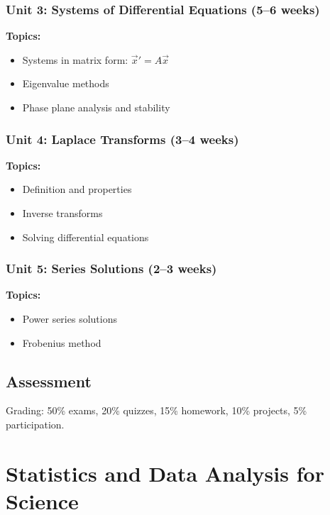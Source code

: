 \documentclass[12pt,oneside]{book}
\begin{document}
\subsection{Unit 3: Systems of Differential Equations (5--6 weeks)}

\textbf{Topics:}
\begin{itemize}
    \item Systems in matrix form: $\vec{x}' = A\vec{x}$
    \item Eigenvalue methods
    \item Phase plane analysis and stability
\end{itemize}

\subsection{Unit 4: Laplace Transforms (3--4 weeks)}

\textbf{Topics:}
\begin{itemize}
    \item Definition and properties
    \item Inverse transforms
    \item Solving differential equations
\end{itemize}

\subsection{Unit 5: Series Solutions (2--3 weeks)}

\textbf{Topics:}
\begin{itemize}
    \item Power series solutions
    \item Frobenius method
\end{itemize}

\section{Assessment}

Grading: 50\% exams, 20\% quizzes, 15\% homework, 10\% projects, 5\% participation.


\chapter{Statistics and Data Analysis for Science}
\end{document}
